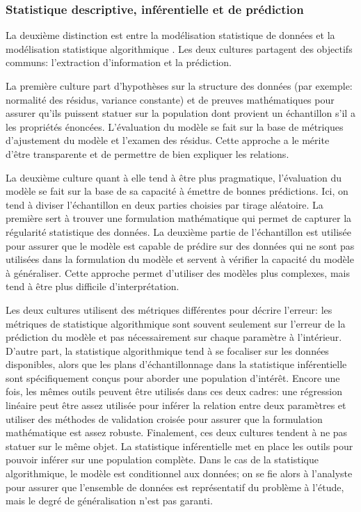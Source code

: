         \subsubsection{Statistique descriptive, inférentielle et de prédiction}
        La deuxième distinction est entre la modélisation statistique de données et la modélisation statistique algorithmique \parencite{breiman_statistical_2001}. Les deux cultures partagent des objectifs communs: l'extraction d'information et la prédiction.\par
        
        La première culture part d'hypothèses sur la structure des données (par exemple: normalité des résidus, variance constante) et de preuves mathématiques pour assurer qu'ils puissent statuer sur la population dont provient un échantillon s'il a les propriétés énoncées. L'évaluation du modèle se fait sur la base de métriques d'ajustement du modèle et l'examen des résidus. Cette approche a le mérite d'être transparente et de permettre de bien expliquer les relations.\par 
        
        La deuxième culture quant à elle tend à être plus pragmatique, l'évaluation du modèle se fait sur la base de sa capacité à émettre de bonnes prédictions. Ici, on tend à diviser l'échantillon en deux parties choisies par tirage aléatoire. La première sert à trouver une formulation mathématique qui permet de capturer la régularité statistique des données. La deuxième partie de l'échantillon est utilisée pour assurer que le modèle est capable de prédire sur des données qui ne sont pas utilisées dans la formulation du modèle et servent à vérifier la capacité du modèle à généraliser. Cette approche permet d'utiliser des modèles plus complexes, mais tend à être plus difficile d'interprétation. \par
        
        Les deux cultures utilisent des métriques différentes pour décrire l'erreur: les métriques de statistique algorithmique sont souvent seulement sur l'erreur de la prédiction du modèle et pas nécessairement sur chaque paramètre à l'intérieur. D'autre part, la statistique algorithmique tend à se focaliser sur les données disponibles, alors que les plans d'échantillonnage dans la statistique inférentielle sont spécifiquement conçus pour aborder une population d'intérêt. Encore une fois, les mêmes outils peuvent être utilisés dans ces deux cadres: une régression linéaire peut être assez utilisée pour inférer la relation entre deux paramètres et utiliser des méthodes de validation croisée pour assurer que la formulation mathématique est assez robuste. Finalement, ces deux cultures tendent à ne pas statuer sur le même objet. La statistique inférentielle met en place les outils pour pouvoir inférer sur une population complète. Dans le cas de la statistique algorithmique, le modèle est conditionnel aux données; on se fie alors à l'analyste pour assurer que l'ensemble de données est représentatif du problème à l'étude, mais le degré de généralisation n'est pas garanti. 

